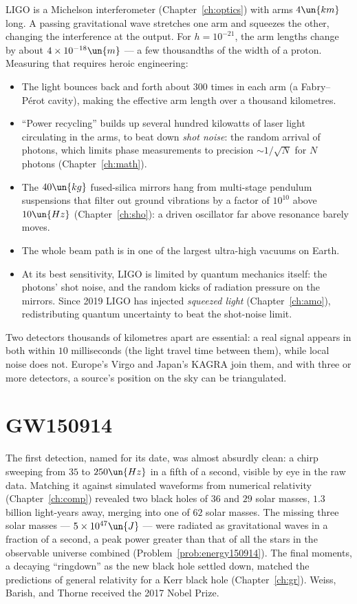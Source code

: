 LIGO is a Michelson interferometer (Chapter~\ref{ch:optics}) with arms $4\un{km}$ long. A passing gravitational wave stretches one arm and squeezes the other, changing the interference at the output. For $h = 10^{-21}$, the arm lengths change by about $4\times10^{-18}\un{m}$ --- a few thousandths of the width of a proton. Measuring that requires heroic engineering:
\begin{itemize}[itemsep=3pt]
  \item The light bounces back and forth about $300$ times in each arm (a Fabry--P\'erot cavity), making the effective arm length over a thousand kilometres.
  \item ``Power recycling'' builds up several hundred kilowatts of laser light circulating in the arms, to beat down \emph{shot noise}: the random arrival of photons, which limits phase measurements to precision $\sim1/\sqrt N$ for $N$ photons (Chapter~\ref{ch:math}).
  \item The $40\un{kg}$ fused-silica mirrors hang from multi-stage pendulum suspensions that filter out ground vibrations by a factor of $10^{10}$ above $10\un{Hz}$ (Chapter~\ref{ch:sho}): a driven oscillator far above resonance barely moves.
  \item The whole beam path is in one of the largest ultra-high vacuums on Earth.
  \item At its best sensitivity, LIGO is limited by quantum mechanics itself: the photons' shot noise, and the random kicks of radiation pressure on the mirrors. Since 2019 LIGO has injected \emph{squeezed light} (Chapter~\ref{ch:amo}), redistributing quantum uncertainty to beat the shot-noise limit.
\end{itemize}
Two detectors thousands of kilometres apart are essential: a real signal appears in both within $10$ milliseconds (the light travel time between them), while local noise does not. Europe's Virgo and Japan's KAGRA join them, and with three or more detectors, a source's position on the sky can be triangulated.

\section{GW150914}

The first detection, named for its date, was almost absurdly clean: a chirp sweeping from $35$ to $250\un{Hz}$ in a fifth of a second, visible by eye in the raw data. Matching it against simulated waveforms from numerical relativity (Chapter~\ref{ch:comp}) revealed two black holes of $36$ and $29$ solar masses, $1.3$ billion light-years away, merging into one of $62$ solar masses. The missing three solar masses --- $5\times10^{47}\un{J}$ --- were radiated as gravitational waves in a fraction of a second, a peak power greater than that of all the stars in the observable universe combined (Problem~\ref{prob:energy150914}). The final moments, a decaying ``ringdown'' as the new black hole settled down, matched the predictions of general relativity for a Kerr black hole (Chapter~\ref{ch:gr}). Weiss, Barish, and Thorne received the 2017 Nobel Prize.

